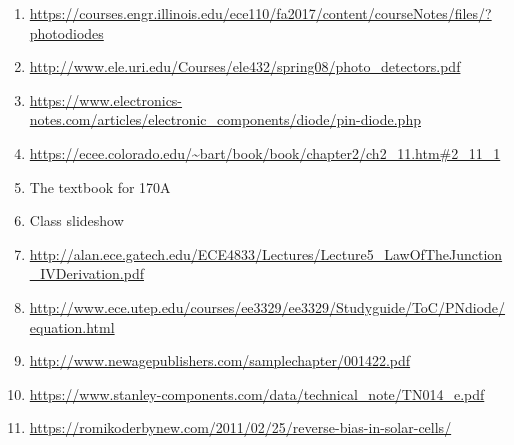 \begin{enumerate}
	\item \label{ref:packaging_pn_diode} \url{https://courses.engr.illinois.edu/ece110/fa2017/content/courseNotes/files/?photodiodes}
	\item \url{http://www.ele.uri.edu/Courses/ele432/spring08/photo_detectors.pdf}
	\item \url{https://www.electronics-notes.com/articles/electronic_components/diode/pin-diode.php}
	\item \label{ref:thermal_eq} \url{https://ecee.colorado.edu/~bart/book/book/chapter2/ch2_11.htm#2_11_1}
	\item \label{ref:carrier_conc_src} The textbook for 170A
	\item \label{ref:slideshow} Class slideshow
	\item \label{ref:law_of_junction} \url{http://alan.ece.gatech.edu/ECE4833/Lectures/Lecture5_LawOfTheJunction_IVDerivation.pdf}
	\item \label{ref:ideal_diode_src} \url{http://www.ece.utep.edu/courses/ee3329/ee3329/Studyguide/ToC/PNdiode/equation.html}
	\item \label{ref:pn-plot-src} \url{http://www.newagepublishers.com/samplechapter/001422.pdf}
	\item \url{https://www.stanley-components.com/data/technical_note/TN014_e.pdf}
	\item \url{https://romikoderbynew.com/2011/02/25/reverse-bias-in-solar-cells/}
\end{enumerate}
